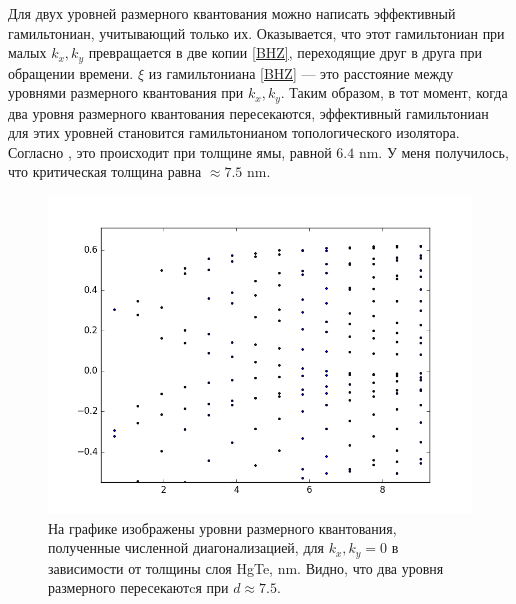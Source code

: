 Для двух уровней размерного квантования можно написать эффективный гамильтониан,
учитывающий только их. Оказывается, что этот гамильтониан при малых $k_x,k_y$ превращается
в две копии 
\eqref{BHZ}, переходящие друг в друга при обращении времени. $\xi$ из гамильтониана \eqref{BHZ} --- это расстояние между уровнями размерного
квантования при $k_x, k_y$. Таким образом, в тот момент, когда два уровня размерного 
квантования пересекаются, эффективный гамильтониан для этих уровней становится 
гамильтонианом топологического изолятора. Согласно \cite{Bernevig2006}, это происходит
при толщине ямы, равной $6.4$ nm. У меня получилось, что критическая толщина равна
$\approx 7.5$ nm.

\begin{figure}[h]
    \includegraphics[width=0.8\linewidth]{dim_quant_levels.png}
    \caption{
            На графике изображены уровни размерного квантования, полученные 
            численной диагонализацией, для $k_x, k_y = 0$
            в зависимости от толщины слоя HgTe, nm. Видно, что два уровня размерного
            пересекаютcя при $d \approx 7.5$.
            }
\end{figure}
